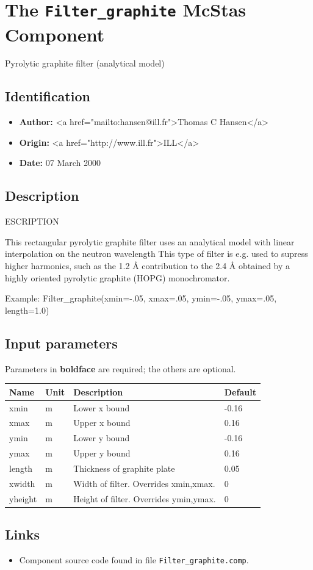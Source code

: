 \section{The \texttt{Filter\_graphite} McStas Component}
Pyrolytic graphite filter (analytical model)

\subsection*{Identification}
\begin{itemize}
  \item \textbf{Author:} \textless{}a href="mailto:hansen@ill.fr"\textgreater{}Thomas C Hansen\textless{}/a\textgreater{}
  \item \textbf{Origin:} \textless{}a href="http://www.ill.fr"\textgreater{}ILL\textless{}/a\textgreater{}
  \item \textbf{Date:} 07 March 2000
\end{itemize}

\subsection*{Description}
ESCRIPTION

This rectangular pyrolytic graphite filter uses an analytical model with linear interpolation on the neutron wavelength This type of filter is e.g. used to supress higher harmonics, such as the 1.2 \AA{} contribution to the 2.4 \AA{} obtained by a highly oriented pyrolytic graphite (HOPG) monochromator.

Example: Filter\_graphite(xmin=-.05, xmax=.05, ymin=-.05, ymax=.05, length=1.0)

\subsection*{Input parameters}
Parameters in \textbf{boldface} are required; the others are optional.

\begin{longtable}{p{}p{}p{}p{}}
\toprule
\textbf{Name} & \textbf{Unit} & \textbf{Description} & \textbf{Default} \\
\midrule
\endhead
xmin & m & Lower x bound & -0.16 \\
xmax & m & Upper x bound & 0.16 \\
ymin & m & Lower y bound & -0.16 \\
ymax & m & Upper y bound & 0.16 \\
length & m & Thickness of graphite plate & 0.05 \\
xwidth & m & Width of filter. Overrides xmin,xmax. & 0 \\
yheight & m & Height of filter. Overrides ymin,ymax. & 0 \\
\bottomrule
\end{longtable}

\subsection*{Links}
\begin{itemize}
  \item Component source code found in file \texttt{Filter\_graphite.comp}.
\end{itemize}
